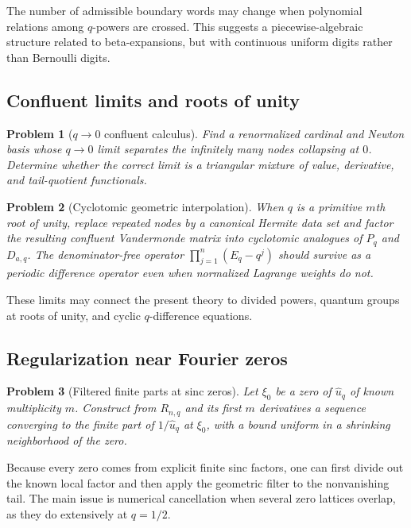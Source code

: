 \documentclass[11pt,a4paper,oneside]{article}
\newtheorem{problem}[problem]{Problem}
\theoremstyle{definition}
\theoremstyle{remark}
\begin{document}
The number of admissible boundary words may change when polynomial relations
among $q$-powers are crossed.  This suggests a piecewise-algebraic structure
related to beta-expansions, but with continuous uniform digits rather than
Bernoulli digits.

\subsection{Confluent limits and roots of unity}

\begin{problem}[$q\to0$ confluent calculus]
\label{prob:q0-confluent}
Find a renormalized cardinal and Newton basis whose $q\to0$ limit separates the
infinitely many nodes collapsing at $0$.  Determine whether the correct limit
is a triangular mixture of value, derivative, and tail-quotient functionals.
\end{problem}

\begin{problem}[Cyclotomic geometric interpolation]
\label{prob:roots-unity}
When $q$ is a primitive $m$th root of unity, replace repeated nodes by a
canonical Hermite data set and factor the resulting confluent Vandermonde
matrix into cyclotomic analogues of $P_q$ and $D_{a,q}$.  The denominator-free
operator
$\prod_{j=1}^n(E_q-q^j)$ should survive as a periodic difference operator even
when normalized Lagrange weights do not.
\end{problem}

These limits may connect the present theory to divided powers, quantum groups
at roots of unity, and cyclic $q$-difference equations.

\subsection{Regularization near Fourier zeros}

\begin{problem}[Filtered finite parts at sinc zeros]
\label{prob:zero-regularization}
Let $\xi_0$ be a zero of $\widehat u_q$ of known multiplicity $m$.  Construct
from $R_{n,q}$ and its first $m$ derivatives a sequence converging to the
finite part of $1/\widehat u_q$ at $\xi_0$, with a bound uniform in a shrinking
neighborhood of the zero.
\end{problem}

Because every zero comes from explicit finite sinc factors, one can first
divide out the known local factor and then apply the geometric filter to the
nonvanishing tail.  The main issue is numerical cancellation when several
zero lattices overlap, as they do extensively at $q=1/2$.
\end{document}
